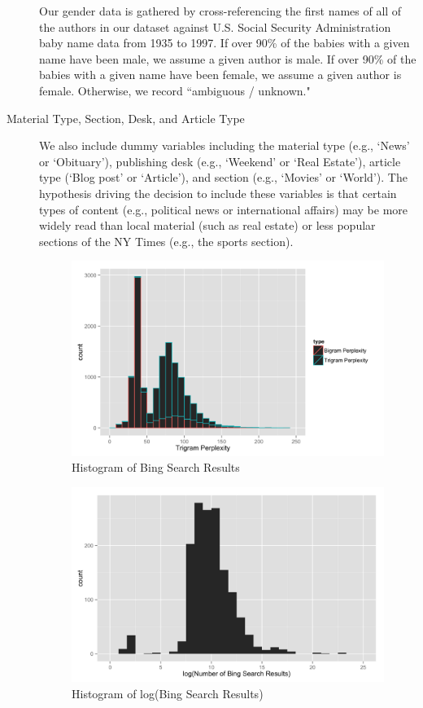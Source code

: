 \documentclass[fleqn,12pt]{SelfArx} %
\begin{document}
\begin{description}
	Our gender data is gathered by cross-referencing the first names of all of the authors in our dataset against U.S. Social Security Administration baby name data from 1935 to 1997. If over 90\% of the babies with a given name have been male, we assume a given author is male. If over 90\% of the babies with a given name have been female, we assume a given author is female. Otherwise, we record ``ambiguous / unknown."
	
	\item[Material Type, Section, Desk, and Article Type] We also include dummy variables including the material type (e.g., `News' or `Obituary'), publishing desk (e.g., `Weekend' or `Real Estate'), article type (`Blog post' or `Article'), and section (e.g., `Movies' or `World'). The hypothesis driving the decision to include these variables is that certain types of content (e.g., political news or international affairs) may be more widely read than local material (such as real estate) or less popular sections of the NY Times (e.g., the sports section).

\begin{figure}[ht]\centering
\includegraphics[width=\linewidth]{author_popularity_histogram.png}
\caption{Histogram of Bing Search Results}
\label{fig:ap_hist}
\end{figure}

\begin{figure}[ht]\centering
\includegraphics[width=\linewidth]{author_popularity_log_histogram.png}
\caption{Histogram of log(Bing Search Results)}
\label{fig:apl_hist}
\end{figure}
	

\end{description}
\end{document}
